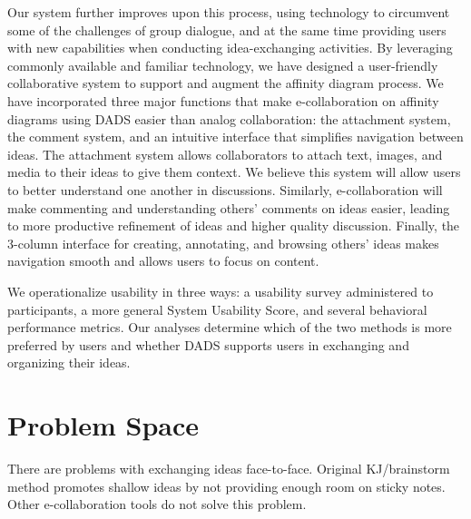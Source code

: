 \documentclass{sigchi}
\begin{document}
Our system further improves upon this process, using technology to circumvent some of the challenges of group dialogue, and at the same time providing users with new capabilities when conducting idea-exchanging activities. By leveraging commonly available and familiar technology, we have designed a user-friendly collaborative system to support and augment the affinity diagram process. We have incorporated three major functions that make e-collaboration on affinity diagrams using DADS easier than analog collaboration: the attachment system, the comment system, and an intuitive interface that simplifies navigation between ideas. The attachment system allows collaborators to attach text, images, and media to their ideas to give them context. We believe this system will allow users to better understand one another in discussions. Similarly, e-collaboration will make commenting and understanding others' comments on ideas easier, leading to more productive refinement of ideas and higher quality discussion. Finally, the 3-column interface for creating, annotating, and browsing others' ideas makes navigation smooth and allows users to focus on content.

We operationalize usability in three ways: a usability survey administered to participants, a more general System Usability Score, and several behavioral performance metrics. Our analyses determine which of the two methods is more preferred by users and whether DADS supports users in exchanging and organizing their ideas.

\section{Problem Space}
There are problems with exchanging ideas face-to-face. Original KJ/brainstorm method promotes shallow ideas by not providing enough room on sticky notes. Other e-collaboration tools do not solve this problem. 
\end{document}
